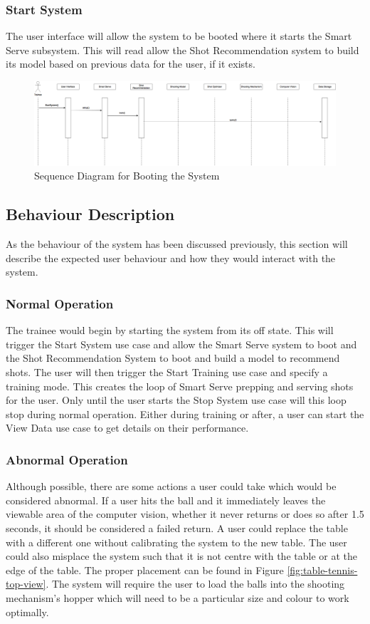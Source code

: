 \documentclass[11pt]{article}
\begin{document}
\subsubsection{Start System}
The user interface will allow the system to be booted where it starts the Smart Serve subsystem. This will read allow the Shot Recommendation system to build its model based on previous data for the user, if it exists.
\begin{figure}[H]
   \centering
   \includegraphics[width=\textwidth]{img/SequenceDiagram-Boot.png}
   \caption{Sequence Diagram for Booting the System}
   \label{fig:boot}
\end{figure}

\subsection{Behaviour Description}
As the behaviour of the system has been discussed previously, this section will describe the expected user behaviour and how they would interact with the system.
\subsubsection{Normal Operation}
The trainee would begin by starting the system from its off state. This will trigger the Start System use case and allow the Smart Serve system to boot and the Shot Recommendation System to boot and build a model to recommend shots. The user will then trigger the Start Training use case and specify a training mode. This creates the loop of Smart Serve prepping and serving shots for the user. Only until the user starts the Stop System use case will this loop stop during normal operation. Either during training or after, a user can start the View Data use case to get details on their performance.
\subsubsection{Abnormal Operation}
Although possible, there are some actions a user could take which would be considered abnormal. If a user hits the ball and it immediately leaves the viewable area of the computer vision, whether it never returns or does so after 1.5 seconds, it should be considered a failed return. A user could replace the table with a different one without calibrating the system to the new table. The user could also misplace the system such that it is not centre with the table or at the edge of the table. The proper placement can be found in Figure \ref{fig:table-tennis-top-view}. The system will require the user to load the balls into the shooting mechanism's hopper which will need to be a particular size and colour to work optimally.
\end{document}
